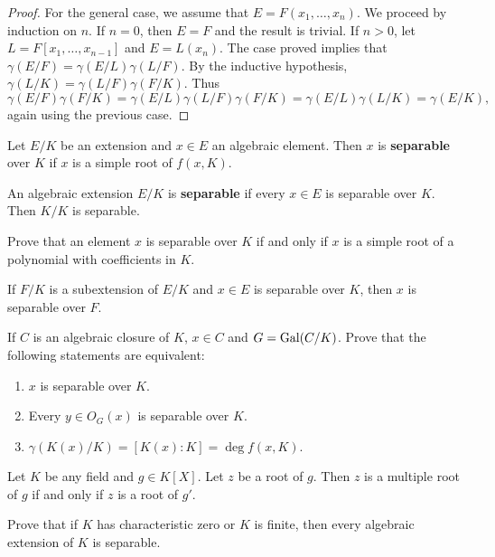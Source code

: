 \begin{proof}
    \medskip 
    For the general case, we assume that $E=F(x_1,\dots,x_n)$. We proceed
    by induction on $n$. If $n=0$, then $E=F$ and the result is trivial. 
    If $n>0$, let $L=F[x_1,\dots,x_{n-1}]$ and $E=L(x_n)$. The 
    case proved 
    implies that $\gamma(E/F)=\gamma(E/L)\gamma(L/F)$. By the inductive 
    hypothesis, $\gamma(L/K)=\gamma(L/F)\gamma(F/K)$. Thus 
    \[
    \gamma(E/F)\gamma(F/K)=\gamma(E/L)\gamma(L/F)\gamma(F/K)
    =\gamma(E/L)\gamma(L/K)=\gamma(E/K),
    \]
    again using the previous case. 
\end{proof}


\begin{definition}
    Let $E/K$ be an extension and $x\in E$ an algebraic element. Then
    $x$ is \textbf{separable} over $K$ if $x$ is a simple root
    of $f(x,K)$. 
\end{definition}

An algebraic extension $E/K$ is \textbf{separable} 
if every $x\in E$ is separable over $K$. Then $K/K$ is separable. 

\begin{exercise}
    Prove that 
    an element $x$ is separable over $K$ if and only if $x$ is a simple root
    of a polynomial with coefficients in $K$. 
\end{exercise}

If $F/K$ is a subextension of $E/K$ and $x\in E$ is separable over $K$, then
$x$ is separable over $F$. 

\begin{exercise}
    If $C$ is an algebraic closure of $K$, $x\in C$ and $G=\operatorname{Gal}(C/K)$. 
    Prove that the following statements are equivalent:
    \begin{enumerate}
        \item $x$ is separable over $K$.
        \item Every $y\in O_G(x)$ is separable over $K$.
        \item $\gamma(K(x)/K)=[K(x):K]=\deg f(x,K)$. 
    \end{enumerate}
\end{exercise}

Let $K$ be any field and $g\in K[X]$. Let $z$ be a root of $g$. 
Then $z$ is a multiple root of $g$ if and only if $z$ is a root of $g'$. 

\begin{exercise}
Prove that if $K$ has characteristic zero or $K$ is finite, then 
every algebraic extension of $K$ is separable. 
\end{exercise}

